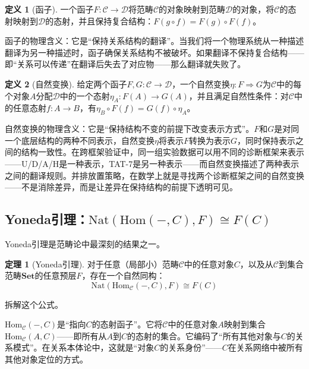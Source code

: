 \documentclass[11pt,a4paper]{book}
\theoremstyle{definition}
\newtheorem{definition}{定义}[chapter]
\newtheorem{theorem}{定理}[chapter]
\begin{document}
\begin{definition}[函子]
一个函子$F: \mathcal{C} \to \mathcal{D}$将范畴$\mathcal{C}$的对象映射到范畴$\mathcal{D}$的对象，将$\mathcal{C}$的态射映射到$\mathcal{D}$的态射，并且保持复合结构：$F(g\circ f) = F(g)\circ F(f)$。
\end{definition}

函子的物理含义：它是“保持关系结构的翻译”。当我们将一个物理系统从一种描述翻译为另一种描述时，函子确保关系结构不被破坏。如果翻译不保持复合结构——即“关系可以传递”在翻译后失去了对应物——那么翻译就失败了。

\begin{definition}[自然变换]
给定两个函子$F, G: \mathcal{C} \to \mathcal{D}$，一个自然变换$\eta: F \Rightarrow G$为$\mathcal{C}$中的每个对象$A$分配$\mathcal{D}$中的一个态射$\eta_A: F(A) \to G(A)$，并且满足自然性条件：对$\mathcal{C}$中的任意态射$f: A \to B$，有$\eta_B\circ F(f) = G(f)\circ\eta_A$。
\end{definition}

自然变换的物理含义：它是“保持结构不变的前提下改变表示方式”。$F$和$G$是对同一个底层结构的两种不同表示，自然变换$\eta$将表示$F$转换为表示$G$，同时保持表示之间的结构一致性。在跨框架验证中，同一组实验数据可以用不同的诊断框架来表示——U/D/A/H是一种表示，TAT-7是另一种表示——而自然变换描述了两种表示之间的翻译规则。并排放置策略，在数学上就是寻找两个诊断框架之间的自然变换——不是消除差异，而是让差异在保持结构的前提下透明可见。

\subsection{Yoneda引理：$\text{Nat}(\text{Hom}(-,C),F)\cong F(C)$}

Yoneda引理是范畴论中最深刻的结果之一。

\begin{theorem}[Yoneda引理]
对于任意（局部小）范畴$\mathcal{C}$中的任意对象$C$，以及从$\mathcal{C}$到集合范畴$\mathbf{Set}$的任意预层$F$，存在一个自然同构：
\begin{equation}
\text{Nat}(\text{Hom}_{\mathcal{C}}(-, C), F) \cong F(C)
\end{equation}
\end{theorem}

拆解这个公式。

$\text{Hom}_{\mathcal{C}}(-, C)$是“指向$C$的态射函子”。它将$\mathcal{C}$中的任意对象$A$映射到集合$\text{Hom}_{\mathcal{C}}(A,C)$——即所有从$A$到$C$的态射的集合。它编码了“所有其他对象与$C$的关系模式”。在关系本体论中，这就是“对象$C$的关系身份”——$C$在关系网络中被所有其他对象定位的方式。
\end{document}
